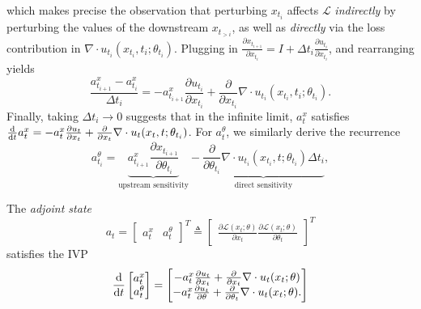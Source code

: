 \documentclass{scrartcl}
\begin{document}
which makes precise the observation that perturbing $x_{t_i}$ affects $\mathcal{L}$ \textit{indirectly} by perturbing the values of the downstream $x_{t_{>i}}$, as well as \textit{directly} via the loss contribution in $\nabla \cdot u_{t_i}(x_{t_i},t_i;\theta_{t_i})$. Plugging in $\frac{\partial x_{t_{i+1}}}{\partial x_{t_i}} = I + \Delta t_i  \frac{\partial u_{t_i}}{\partial x_{t_i}}$, and rearranging yields
\begin{equation*}
\frac{a^x_{t_{i+1}} - a^x_{t_{i}}}{\Delta t_i} = -a^x_{t_{i+1}} \frac{\partial u_{t_i}}{\partial x_{t_i}} + \frac{\partial}{\partial x_{t_i}} \nabla \cdot u_{t_i}(x_{t_i},t_i;\theta_{t_i}).
\end{equation*}
Finally, taking $\Delta t_i \to 0$ suggests that in the infinite limit, $a_t^x$ satisfies $\frac{\d}{\d t} a^x_t = -a^x_t \frac{\partial u_t}{\partial x_t} + \frac{\partial}{\partial x_t} \nabla \cdot u_t(x_t,t;\theta_{t_i})$. For $a^\theta_t$, we similarly derive the recurrence
\begin{equation*}
    a^\theta_{t_i} = \underbrace{a^x_{t_{i+1}} \frac{\partial x_{t_{i+1}}}{\partial \theta_{t_i}}}_{\text{upstream sensitivity}} - \underbrace{\frac{\partial}{\partial \theta_{t_i}} \nabla \cdot u_{t_i}(x_{t_i},t;\theta_{t_i}) \Delta t_i}_{\text{direct sensitivity}},
\end{equation*}



\begin{resultbox}
The \textit{adjoint state} \begin{equation} a_t = \begin{bmatrix}a_t^x & a_t^\theta \end{bmatrix}^T \triangleq \begin{bmatrix} \frac{\partial \mathcal{L}(x_t; \theta)}{\partial x_t } \frac{\partial \mathcal{L}(x_t; \theta)}{\partial \theta_t}\end{bmatrix}^T\end{equation} satisfies the IVP
\begin{equation}
\frac{\d}{\d t} \begin{bmatrix}a_t^x \\ a_t^\theta \end{bmatrix} = \begin{bmatrix} 
    -a_t^x\frac{\partial u_t}{\partial x_t} + \frac{\partial}{\partial x_t} \nabla \cdot u_t(x_t; \theta) \\
    -a_t^x \frac{\partial u_t}{\partial \theta} + \frac{\partial}{\partial \theta_t} \nabla \cdot u_t(x_t; \theta).
\end{bmatrix}
\end{equation}
\end{resultbox}
\end{document}
